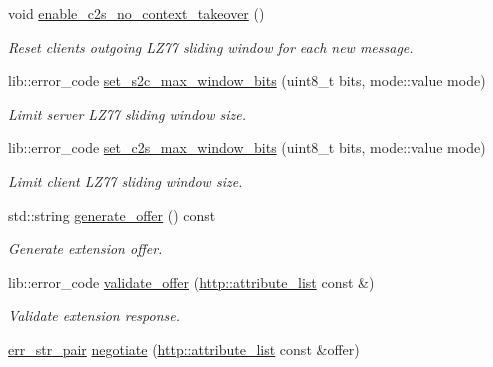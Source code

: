 \begin{DoxyCompactItemize}
void \hyperlink{classwebsocketpp_1_1extensions_1_1permessage__deflate_1_1enabled_a03f6a2a8f032cd4db04c6cc6fcea906b}{enable\+\_\+c2s\+\_\+no\+\_\+context\+\_\+takeover} ()
\begin{DoxyCompactList}\small\item\em Reset client\textquotesingle{}s outgoing L\+Z77 sliding window for each new message. \end{DoxyCompactList}\item 
lib\+::error\+\_\+code \hyperlink{classwebsocketpp_1_1extensions_1_1permessage__deflate_1_1enabled_ab982e493e69184e155fd63902ad3ddfc}{set\+\_\+s2c\+\_\+max\+\_\+window\+\_\+bits} (uint8\+\_\+t bits, mode\+::value mode)
\begin{DoxyCompactList}\small\item\em Limit server L\+Z77 sliding window size. \end{DoxyCompactList}\item 
lib\+::error\+\_\+code \hyperlink{classwebsocketpp_1_1extensions_1_1permessage__deflate_1_1enabled_a21218fcdfcb8caf285937bb7bb5f0e03}{set\+\_\+c2s\+\_\+max\+\_\+window\+\_\+bits} (uint8\+\_\+t bits, mode\+::value mode)
\begin{DoxyCompactList}\small\item\em Limit client L\+Z77 sliding window size. \end{DoxyCompactList}\item 
std\+::string \hyperlink{classwebsocketpp_1_1extensions_1_1permessage__deflate_1_1enabled_adc342a368792f5beee8dddbbc5981846}{generate\+\_\+offer} () const
\begin{DoxyCompactList}\small\item\em Generate extension offer. \end{DoxyCompactList}\item 
lib\+::error\+\_\+code \hyperlink{classwebsocketpp_1_1extensions_1_1permessage__deflate_1_1enabled_acf45724e34c174a0b8a5166192f659de}{validate\+\_\+offer} (\hyperlink{namespacewebsocketpp_1_1http_a9744f4104772b987aa9e86c35ce1357b}{http\+::attribute\+\_\+list} const \&)
\begin{DoxyCompactList}\small\item\em Validate extension response. \end{DoxyCompactList}\item 
\hyperlink{namespacewebsocketpp_abecf95d53c9387716b157daae84441f3}{err\+\_\+str\+\_\+pair} \hyperlink{classwebsocketpp_1_1extensions_1_1permessage__deflate_1_1enabled_aa05eda4f6a0231c13708445480181ff4}{negotiate} (\hyperlink{namespacewebsocketpp_1_1http_a9744f4104772b987aa9e86c35ce1357b}{http\+::attribute\+\_\+list} const \&offer)

\end{DoxyCompactItemize}
